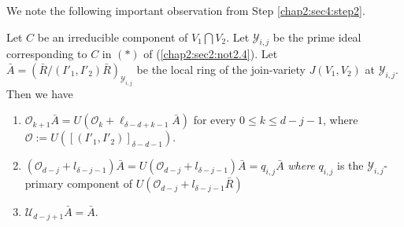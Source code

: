  We note the following important observation from Step
 \ref{chap2:sec4:step2}. 
  
\setcounter{lemma}{18}
\begin{lemma}\label{chap2:sec4:lem2.19}
  Let $C$ be an irreducible component of $V_1 \bigcap V_2$. Let
  $\mathscr{Y}_{i, j}$ be the prime ideal corresponding to $C$ in
  $(*)$ of (\ref{chap2:sec2:not2.4}). Let
  $\bar{A}=(\bar{R}/(I'_1,I'_2)\bar{R})_{\mathscr{Y}_{i,j}}$ be the
  local ring of the join-variety $J(V_1,V_2)$ at
  $\mathscr{Y}_{i,j}$. Then we have 
  \begin{enumerate}[\rm (i)]
  \item
    $\mathscr{O}_{k+1}\bar{A}=U(\mathscr{O}_k+\ell_{\delta-d+k-1}\bar{A})$
    for every $0\leq k \leq d-j-1$, where
      $\mathscr{O}:=U([(I'_1,I'_2)]_{\delta-d-1})$. 
  \item
    $(\mathscr{O}_{d-j}+l_{\delta-j-1})\bar{A}=U(\mathscr{O}_{d-j}+l_{\delta-j-1})
    \bar{A}=q_{i, j}\bar{A}$ \textit{where} $q_{i,j}$ is the
    $\mathscr{Y}_{i, j}$-primary component of
    $U(\mathscr{O}_{d-j}+l_{\delta-j-1}\bar{R}) $ 
  \item  $\mathscr{U}_{d-j+1}\bar{A} = \bar{A}$.
 \end{enumerate} 
\end{lemma}

